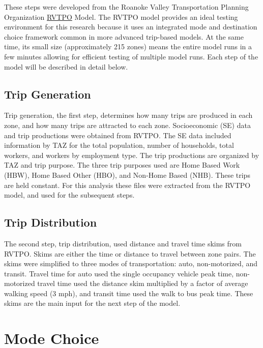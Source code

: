\documentclass[fancy, masters,twoside]{byuthesis}
\begin{document}
These steps were developed from the Roanoke Valley Transportation Planning Organization \href{https://github.com/xinwangvdot/rvtpo}{RVTPO} Model. The RVTPO model provides an ideal testing environment for this research because it uses an integrated mode and destination choice framework common in more advanced trip-based models. At the same time, its small size (approximately 215 zones) means the entire model runs in a few minutes allowing for efficient testing of multiple model runs. Each step of the model will be described in detail below.

\hypertarget{trip-generation}{%
\subsection{Trip Generation}\label{trip-generation}}

Trip generation, the first step, determines how many trips are produced in each zone, and how many trips are attracted to each zone. Socioeconomic (SE) data and trip productions were obtained from RVTPO. The SE data included information by TAZ for the total population, number of households, total workers, and workers by employment type. The trip productions are organized by TAZ and trip purpose. The three trip purposes used are Home Based Work (HBW), Home Based Other (HBO), and Non-Home Based (NHB). These trips are held constant. For this analysis these files were extracted from the RVTPO model, and used for the subsequent steps.

\hypertarget{trip-distribution}{%
\subsection{Trip Distribution}\label{trip-distribution}}

The second step, trip distribution, used distance and travel time skims from RVTPO. Skims are either the time or distance to travel between zone pairs. The skims were simplified to three modes of transportation: auto, non-motorized, and transit. Travel time for auto used the single occupancy vehicle peak time, non-motorized travel time used the distance skim multiplied by a factor of average walking speed (3 mph), and transit time used the walk to bus peak time. These skims are the main input for the next step of the model.

\hypertarget{mode-choice}{%
\section{Mode Choice}\label{mode-choice}}
\end{document}
